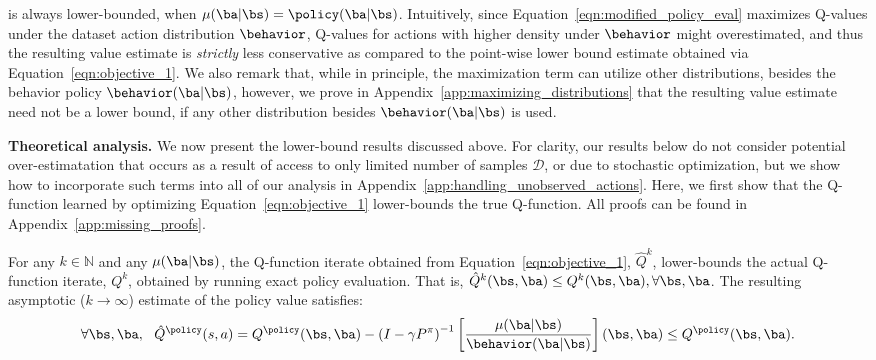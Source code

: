 is always lower-bounded, when $\mu(\ba|\bs) = \policy(\ba|\bs)$. Intuitively, since Equation~\ref{eqn:modified_policy_eval} maximizes Q-values under the dataset action distribution $\behavior$, Q-values for actions with higher density under $\behavior$ might overestimated, and thus the resulting value estimate is \textit{strictly} less conservative as compared to the point-wise lower bound estimate obtained via Equation~\ref{eqn:objective_1}. We also remark that, while in principle, the maximization term can utilize other distributions, besides the behavior policy $\behavior(\ba|\bs)$, however, we prove in Appendix~\ref{app:maximizing_distributions} that the resulting value estimate need not be a lower bound, if any other distribution besides $\behavior(\ba|\bs)$ is used.


\textbf{Theoretical analysis.} We now present the lower-bound results discussed above. For clarity, our results below do not consider potential over-estimatation that occurs as a result of access to only limited number of samples $\mathcal{D}$, or due to stochastic optimization, but we show how to incorporate such terms into all of our analysis in Appendix~\ref{app:handling_unobserved_actions}. Here, we first show that the Q-function learned by optimizing Equation~\ref{eqn:objective_1} lower-bounds the true Q-function. All proofs can be found in Appendix~\ref{app:missing_proofs}.
\begin{proposition}
\label{thm:min_q_underestimates}
For any $k \in \mathbb{N}$ and any $\mu(\ba|\bs)$, the Q-function iterate obtained from Equation~\ref{eqn:objective_1}, $\hat{Q}^k$, lower-bounds the actual Q-function iterate, $Q^k$, obtained by running exact policy evaluation.
That is, $\hat{Q}^k(\bs, \ba) \leq Q^k(\bs, \ba), \forall \bs, \ba$. 
The resulting asymptotic ($k \rightarrow \infty$) estimate of the policy value satisfies: 
\begin{equation*}
\forall \bs, \ba, ~~ \hat{Q}^\policy(s, a) = Q^\policy(\bs, \ba) - \left(I - \gamma P^\pi \right)^{-1} \left[\frac{\mu(\ba|\bs)}{\behavior(\ba|\bs)} \right](\bs, \ba) \leq Q^\policy(\bs, \ba).    
\end{equation*}
\end{proposition}


